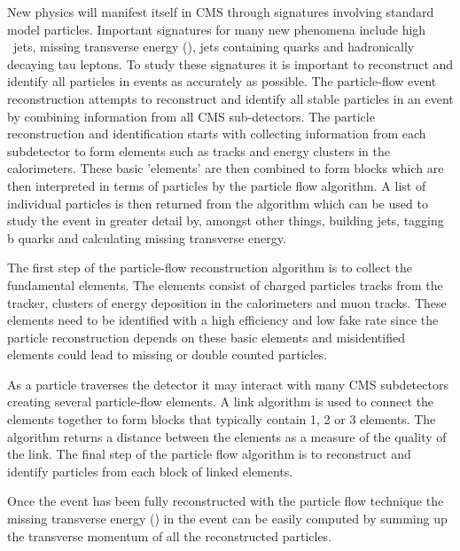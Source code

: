 New physics will manifest itself in CMS through signatures involving standard
model particles. Important signatures for many new phenomena include high \Pt\
jets, missing transverse energy (\met), jets containing \Pbottom quarks and
hadronically decaying tau leptons. To study these signatures it is important to
reconstruct and identify all particles in events as accurately as possible. The
particle-flow event reconstruction attempts to reconstruct and identify all
stable particles in an event by combining information from all CMS
sub-detectors. The particle reconstruction and identification starts with
collecting information from each subdetector to form elements such as tracks
and energy clusters in the calorimeters. These basic 'elements' are then
combined to form blocks which are then interpreted in terms of particles by the
particle flow algorithm. A list of individual particles is then returned from
the algorithm which can be used to study the event in greater detail by,
amongst other things, building jets, tagging b quarks and calculating missing
transverse energy.\cite{PF}

The first step of the particle-flow reconstruction algorithm is to collect the
fundamental elements. The elements consist of charged particles tracks from the
tracker, clusters of energy deposition in the calorimeters and muon tracks.
These elements need to be identified with a high efficiency and low fake rate
since the particle reconstruction depends on these basic elements and
misidentified elements could lead to missing or double counted
particles.\cite{PF}

As a particle traverses the detector it may interact with many CMS subdetectors
creating several particle-flow elements. A link algorithm is used to connect
the elements together to form blocks that typically contain 1, 2 or 3 elements.
The algorithm returns a distance between the elements as a measure of the
quality of the link. The final step of the particle flow algorithm is to
reconstruct and identify particles from each block of linked elements.\cite{PF}

Once the event has been fully reconstructed with the particle flow technique
the missing transverse energy (\met) in the event can be easily computed by
summing up the transverse momentum of all the reconstructed particles.\cite{PF}

